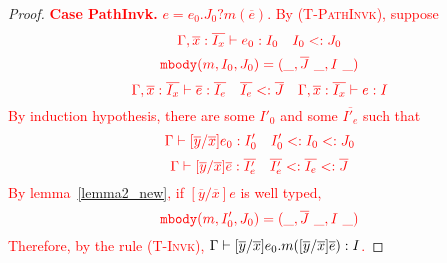 \begin{lemma}
\begin{proof}
\noindent\textcolor{red}{\textbf{Case PathInvk.} $e = e_0.J_0?m(\overline{e})$. By \textsc{(T-PathInvk)}, suppose}
	$$\textcolor{red}{\Gamma, \overline{x}:\overline{I_x} \; {\vdash} \; e_0 : I_0 \quad I_0 <: J_0}$$
	$$\textcolor{red}{\texttt{mbody}(m, I_0, J_0) = (\_, \overline{J}\ \_, I\ \_)}$$
	$$\textcolor{red}{\Gamma, \overline{x}:\overline{I_x} \; {\vdash} \; \overline{e} : \overline{I_e} \quad 
	  \overline{I_e} <: \overline{J} \quad \Gamma, \overline{x}:\overline{I_x} \; {\vdash} \; e : I}$$
\textcolor{red}{By induction hypothesis, there are some $I'_0$ and some $\overline{I'_e}$ such that}
	$$\textcolor{red}{\Gamma \; {\vdash} \; [\overline{y}/\overline{x}]e_0 : I_0' \quad I_0' <: I_0 <: J_0}$$
	$$\textcolor{red}{\Gamma \; {\vdash} \; [\overline{y}/\overline{x}]\overline{e} : \overline{I_e'} \quad 
	  \overline{I_e'} <: \overline{I_e} <: \overline{J}}$$   
\textcolor{red}{By lemma~\ref{lemma2_new}, if $[\overline{y}/\overline{x}]e$ is well typed,}
	$$\textcolor{red}{\texttt{mbody}(m, I'_0, J_0) = (\_, \overline{J}\ \_, I\ \_)}$$
\textcolor{red}{Therefore, by the rule \textsc{(T-Invk)}, 
	$\Gamma \; {\vdash} \; [\overline{y}/\overline{x}]e_0.m([\overline{y}/\overline{x}]\overline{e}) : I$.}



\end{proof}

\end{lemma}



